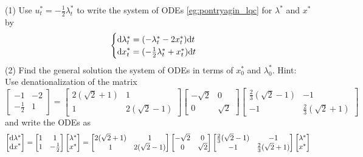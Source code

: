 \documentclass[11pt]{book}
\newcommand{\dd}{\text{\normalfont d}}
\newcommand{\dt}{\text{\normalfont d}t}
\newcommand{\dx}{\text{\normalfont d}x}
\begin{document}
\begin{ex}
    (1) Use $u^*_t=-\frac{1}{2}\lambda^*_t$ to write the system of ODEs \eqref{eg:pontryagin_lqc} for $\lambda^*$ and $x^*$ by
    \begin{equation}
        \begin{cases}
        {\dd}\lambda^*_t= (- \lambda^*_t - 2x^*_t){{\dt}}\\
        {\dx}^*_t=( -\frac12\lambda^*_t+x^*_t  ){{\dt}}
        \end{cases}
    \end{equation}
    (2) Find the general solution the system of ODEs in terms of $x^*_0$ and $\lambda^*_0$. Hint: Use denationalization of the matrix 
    \begin{equation}
        \left[
        \begin{matrix}
            -1&-2\\
            -\frac12&1
        \end{matrix}
        \right] =\left[\begin{matrix}2(\sqrt2+1)&1\\1&2(\sqrt2-1)\end{matrix}\right] \left[\begin{matrix}-\sqrt{2}&0\\0&\sqrt{2}\end{matrix}\right] \left[\begin{matrix}\frac23(\sqrt2-1)&-1\\-1&\frac23(\sqrt2+1)\end{matrix}\right]
    \end{equation}
    and write the ODEs as 
    \begin{equation}
        \left[\begin{matrix}{\dd}\lambda^*\\{\dx}^*\end{matrix}\right] = \left[
        \begin{matrix}
            1&1\\
            1&-\frac12
        \end{matrix}
        \right] 
        \left[\begin{matrix}\lambda^*\\x^*\end{matrix}\right] = \left[\begin{matrix}2(\sqrt2+1)&1\\1&2(\sqrt2-1)\end{matrix}\right] \left[\begin{matrix}-\sqrt{2}&0\\0&\sqrt{2}\end{matrix}\right] \left[\begin{matrix}\frac23(\sqrt2-1)&-1\\-1&\frac23(\sqrt2+1)\end{matrix}\right]\left[\begin{matrix}\lambda^*\\x^*\end{matrix}\right]

\end{equation}
\end{ex}
\end{document}
